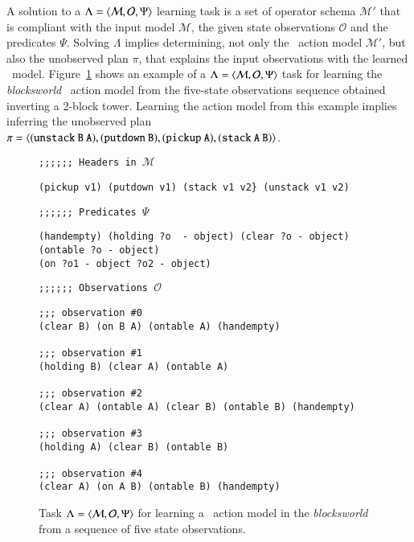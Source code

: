 A solution to a $\Lambda={\langle \mathcal{M},\mathcal{O},\Psi \rangle}$ learning task is a set of operator schema $\mathcal{M}'$ that is compliant with the input model $\mathcal{M}$, the given state observations $\mathcal{O}$ and the predicates $\Psi$. Solving $\Lambda$ implies determining, not only the \strips\ action model $\mathcal{M}'$, but also the unobserved plan $\pi$, that explains the input observations with the learned \strips\ model. Figure~\ref{fig:example-observations} shows an example of a $\Lambda={\langle \mathcal{M},\mathcal{O},\Psi \rangle}$ task for learning the {\em blocksworld} \strips\ action model from the five-state observations sequence obtained inverting a 2-block tower. Learning the action model from this example implies inferring the unobserved plan $\pi=\tup{\small\tt (unstack\ B\ A), (putdown\ B), (pickup\ A), (stack\ A\ B)}$.

\begin{figure}[hbt!]
{\footnotesize\tt ;;;;;; Headers in $\mathcal{M}$}
\begin{footnotesize}
\begin{verbatim}
(pickup v1) (putdown v1) (stack v1 v2} (unstack v1 v2)
\end{verbatim}
\end{footnotesize}
\vspace{0.2cm}
{\footnotesize\tt ;;;;;; Predicates $\Psi$}
\begin{footnotesize}
\begin{verbatim}
(handempty) (holding ?o  - object) (clear ?o - object) (ontable ?o - object)
(on ?o1 - object ?o2 - object)
\end{verbatim}
\end{footnotesize}
\vspace{0.2cm}
{\footnotesize\tt ;;;;;; Observations $\mathcal{O}$}
\begin{footnotesize}
\begin{verbatim}
;;; observation #0
(clear B) (on B A) (ontable A) (handempty)

;;; observation #1
(holding B) (clear A) (ontable A)

;;; observation #2
(clear A) (ontable A) (clear B) (ontable B) (handempty)

;;; observation #3
(holding A) (clear B) (ontable B)

;;; observation #4
(clear A) (on A B) (ontable B) (handempty)
\end{verbatim}
\end{footnotesize}
 \caption{\small Task $\Lambda={\langle \mathcal{M},\mathcal{O},\Psi \rangle}$ for learning a \strips\ action model in the {\em blocksworld} from a sequence of five state observations.}
\label{fig:example-observations}
\end{figure}

